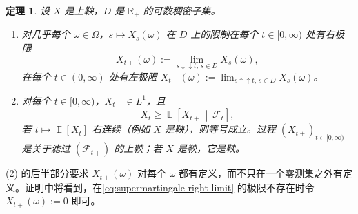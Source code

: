 \documentclass[UTF8,11pt,a4paper,oneside,fontset=fandol]{ctexrep}
\numberwithin{equation}{section}
\theoremstyle{zhthm}
\newtheorem{theorem}{定理}[section]
\newcommand{\R}{\mathbb{R}}
\newcommand{\F}{\mathcal{F}}
\DeclareMathOperator{\E}{\mathbb{E}}
\newcommand{\Econd}[2]{%
  \E\!\left[#1\,\middle|\,#2\right]}
\begin{document}
\begin{theorem}
\label{thm:supermartingale-limits}
设 $X$ 是上鞅，$D$ 是 $\R_+$ 的可数稠密子集。
\begin{enumerate}[label=(\arabic*)]
  \item 对几乎每个 $\omega\in\Omega$，$s\mapsto X_s(\omega)$ 在 $D$ 上的限制在每个 $t\in[0,\infty)$ 处有右极限
    \begin{equation}
      \label{eq:supermartingale-right-limit}
      X_{t+}(\omega):=\lim_{s\downarrow\downarrow t,\,s\in D}X_s(\omega),
    \end{equation}
    在每个 $t\in(0,\infty)$ 处有左极限 $X_{t-}(\omega):=\lim_{s\uparrow\uparrow t,\,s\in D}X_s(\omega)$。
  \item 对每个 $t\in[0,\infty)$，$X_{t+}\in L^1$，且
    \[
      X_t\ge\Econd{X_{t+}}{\F_t},
    \]
    若 $t\mapsto\E[X_t]$ 右连续（例如 $X$ 是鞅），则等号成立。过程 $(X_{t+})_{t\in[0,\infty)}$ 是关于滤过 $(\F_{t+})$ 的上鞅；若 $X$ 是鞅，它是鞅。
\end{enumerate}
\end{theorem}

(2) 的后半部分要求 $X_{t+}(\omega)$ 对每个 $\omega$ 都有定义，而不只在一个零测集之外有定义。证明中将看到，在\cref{eq:supermartingale-right-limit} 的极限不存在时令 $X_{t+}(\omega):=0$ 即可。
\end{document}
